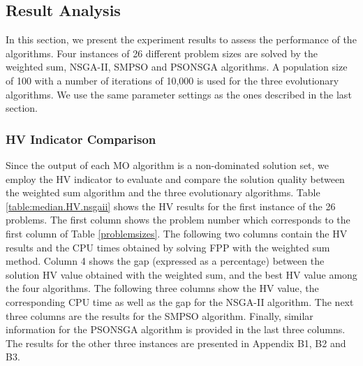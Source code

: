 \documentclass[10pt,journal,compsoc]{IEEEtran}
\begin{document}

\subsection{Result Analysis}\label{resultanalyssi}
In this section, we present the experiment results to assess the performance of the algorithms.
Four instances of 26 different problem sizes are solved by the weighted sum, NSGA-II, SMPSO and PSONSGA algorithms.
A population size of 100 with a number of iterations of 10,000 is used for the three evolutionary algorithms. We use the same parameter settings as the ones described in the last section.
\subsubsection{HV Indicator Comparison}
Since the output of each MO algorithm is a non-dominated solution set, we employ the HV indicator \cite{Auger:2009:THI:1527125.1527138} to evaluate and compare the solution quality between the weighted sum algorithm and the three evolutionary algorithms. 
\iffalse
Table \ref{table:median.HV.nsgaii} shows the HV results for the first instance of the 26 problems. The first column shows the problem number which corresponds to the first column of Table \ref{problemsizes}. The following two columns contain the HV results and the CPU times obtained by solving FPP with the weighted sum method. Column 4 shows the gap (expressed as a percentage) between the solution HV value obtained with the weighted sum, and the best HV value among the four algorithms. The following three columns show the HV value, the corresponding CPU time as well as the gap for the NSGA-II algorithm. The next three columns are the results for the SMPSO algorithm. Finally, similar information for the PSONSGA algorithm is provided in the last three columns. The results for the other three instances are presented in Appendix B1, B2 and B3.
\end{document}
